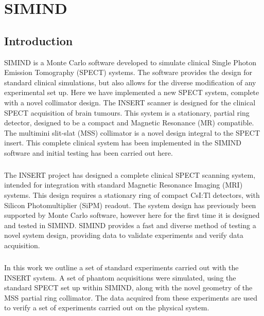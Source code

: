 \chapter{SIMIND}
\label{SIMIND}



\section{Introduction}
SIMIND is a Monte Carlo software developed to simulate clinical Single Photon Emission Tomography (SPECT) systems. The software provides the design for standard clinical simulations, but also allows for the diverse modification of any experimental set up. Here we have implemented a new SPECT system, complete with a novel collimator design. The INSERT scanner is designed for the clinical SPECT acquisition of brain tumours. This system is a stationary, partial ring detector, designed to be a compact and Magnetic Resonance (MR) compatible. The multimini slit-slat (MSS) collimator is a novel design integral to the SPECT insert. This complete clinical system has been implemented in the SIMIND software and initial testing has been carried out here. 
\paragraph{}
The INSERT project has designed a complete clinical SPECT scanning system, intended for integration with standard Magnetic Resonance Imaging (MRI) systems. This design requires a stationary ring of compact CsI:Tl detectors, with Silicon Photomultiplier (SiPM) readout. The system design has previously been supported by Monte Carlo software, however here for the first time it is designed and tested in SIMIND. SIMIND provides a fast and diverse method of testing a novel system design, providing data to validate experiments and verify data acquisition.
\paragraph{}
In this work we outline a set of standard experiments carried out with the INSERT system. A set of phantom acquisitions were simulated, using the standard SPECT set up within SIMIND, along with the novel geometry of the MSS partial ring collimator. The data acquired from these experiments are used to verify a set of experiments carried out on the physical system. 

